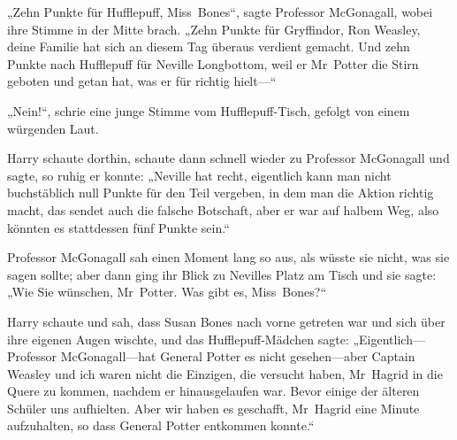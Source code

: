 „Zehn Punkte für Hufflepuff, Miss~Bones“, sagte Professor McGonagall, wobei ihre Stimme in der Mitte brach. „Zehn Punkte für Gryffindor, Ron Weasley, deine Familie hat sich an diesem Tag überaus verdient gemacht. Und zehn Punkte nach Hufflepuff für Neville Longbottom, weil er Mr~Potter die Stirn geboten und getan hat, was er für richtig hielt—“

„Nein!“, schrie eine junge Stimme vom Hufflepuff-Tisch, gefolgt von einem würgenden Laut.

Harry schaute dorthin, schaute dann schnell wieder zu Professor McGonagall und sagte, so ruhig er konnte:
„Neville hat recht, eigentlich kann man nicht buchstäblich null Punkte für den Teil vergeben, in dem man die Aktion richtig macht, das sendet auch die falsche Botschaft, aber er war auf halbem Weg, also könnten es stattdessen fünf Punkte sein.“

Professor McGonagall sah einen Moment lang so aus, als wüsste sie nicht, was sie sagen sollte; aber dann ging ihr Blick zu Nevilles Platz am Tisch und sie sagte: „Wie Sie wünschen, Mr~Potter. Was gibt es, Miss~Bones?“

Harry schaute und sah, dass Susan Bones nach vorne getreten war und sich über ihre eigenen Augen wischte, und das Hufflepuff-Mädchen sagte: „Eigentlich—Professor McGonagall—hat General Potter es nicht gesehen—aber Captain Weasley und ich waren nicht die Einzigen, die versucht haben, Mr~Hagrid in die Quere zu kommen, nachdem er hinausgelaufen war. Bevor einige der älteren Schüler uns aufhielten. Aber wir haben es geschafft, Mr~Hagrid eine Minute aufzuhalten, so dass General Potter entkommen konnte.“

